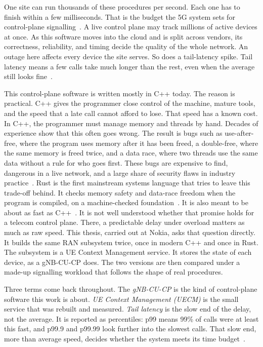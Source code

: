 \documentclass[english,oneside,a4paper,censored,csm,software-track-2020]{HYthesisML}
\begin{document}
One site can run thousands of these procedures per second.
Each one has to finish within a few milliseconds. That is the budget the 5G system sets for control-plane signalling~\cite{3gpp38913}.
A live control plane may track millions of active devices at once.
As this software moves into the cloud and is split across vendors, its correctness, reliability, and timing decide the quality of the whole network.
An outage here affects every device the site serves.
So does a tail-latency spike.
Tail latency means a few calls take much longer than the rest, even when the average still looks fine~\cite{dean2013tail,barroso2017microseconds}.


This control-plane software is written mostly in C++ today.
The reason is practical. C++ gives the programmer close control of the machine, mature tools, and the speed that a late call cannot afford to lose.
That speed has a known cost.
In C++, the programmer must manage memory and threads by hand.
Decades of experience show that this often goes wrong.
The result is bugs such as use-after-free, where the program uses memory after it has been freed, a double-free, where the same memory is freed twice, and a data race, where two threads use the same data without a rule for who goes first.
These bugs are expensive to find, dangerous in a live network, and a large share of security flaws in industry practice~\cite{msrc2019memory,google2022android}.
Rust is the first mainstream systems language that tries to leave this trade-off behind.
It checks memory safety and data-race freedom when the program is compiled, on a machine-checked foundation~\cite{klabnik2023rust,jung2018rustbelt}.
It is also meant to be about as fast as C++~\cite{balasubramanian2017rust}.
It is not well understood whether that promise holds for a telecom control plane.
There, a predictable delay under overload matters as much as raw speed.
This thesis, carried out at Nokia, asks that question directly.
It builds the same RAN subsystem twice, once in modern C++ and once in Rust.
The subsystem is a UE Context Management service. It stores the state of each device, as a gNB-CU-CP does.
The two versions are then compared under a made-up signalling workload that follows the shape of real procedures.


Three terms come back throughout.
The \emph{gNB-CU-CP} is the kind of control-plane software this work is about.
\emph{UE Context Management (UECM)} is the small service that was rebuilt and measured.
\emph{Tail latency} is the slow end of the delay, not the average.
It is reported as percentiles: p99 means 99\% of calls were at least this fast, and p99.9 and p99.99 look further into the slowest calls.
That slow end, more than average speed, decides whether the system meets its time budget~\cite{dean2013tail,barroso2017microseconds}.
\end{document}
